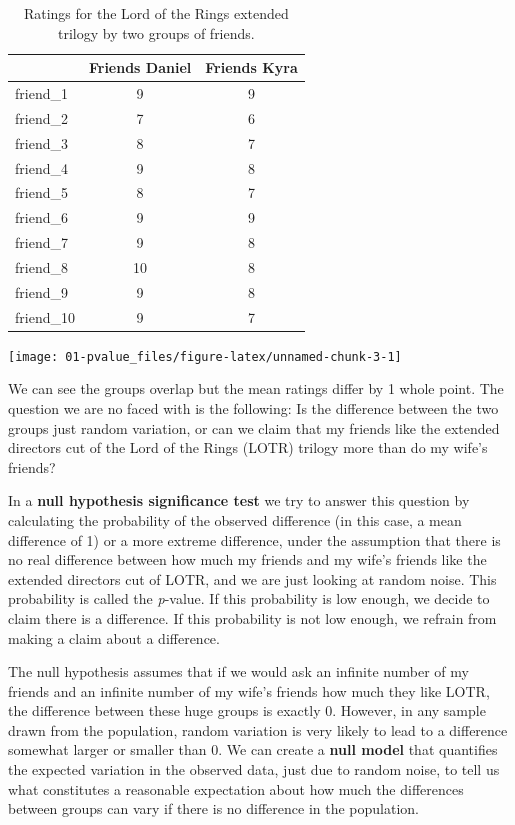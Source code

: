 \documentclass[
  oneside]{krantz}
\begin{document}
\begin{table}

\caption{\label{tab:friends}Ratings for the Lord of the Rings extended trilogy by two groups of friends.}
\begin{tabular}[t]{lcc}
\toprule
 & Friends Daniel & Friends Kyra\\
\midrule
friend\_1 & 9 & 9\\
friend\_2 & 7 & 6\\
friend\_3 & 8 & 7\\
friend\_4 & 9 & 8\\
friend\_5 & 8 & 7\\
\addlinespace
friend\_6 & 9 & 9\\
friend\_7 & 9 & 8\\
friend\_8 & 10 & 8\\
friend\_9 & 9 & 8\\
friend\_10 & 9 & 7\\
\bottomrule
\end{tabular}
\end{table}

\begin{center}\texttt{[image: 01-pvalue\_files/figure-latex/unnamed-chunk-3-1]} \end{center}

We can see the groups overlap but the mean ratings differ by 1 whole point. The question we are no faced with is the following: Is the difference between the two groups just random variation, or can we claim that my friends like the extended directors cut of the Lord of the Rings (LOTR) trilogy more than do my wife's friends?

In a \textbf{null hypothesis significance test} we try to answer this question by calculating the probability of the observed difference (in this case, a mean difference of 1) or a more extreme difference, under the assumption that there is no real difference between how much my friends and my wife's friends like the extended directors cut of LOTR, and we are just looking at random noise. This probability is called the \emph{p}-value. If this probability is low enough, we decide to claim there is a difference. If this probability is not low enough, we refrain from making a claim about a difference.

The null hypothesis assumes that if we would ask an infinite number of my friends and an infinite number of my wife's friends how much they like LOTR, the difference between these huge groups is exactly 0. However, in any sample drawn from the population, random variation is very likely to lead to a difference somewhat larger or smaller than 0. We can create a \textbf{null model} that quantifies the expected variation in the observed data, just due to random noise, to tell us what constitutes a reasonable expectation about how much the differences between groups can vary if there is no difference in the population.
\end{document}
